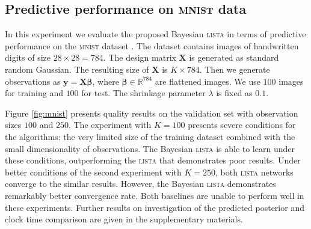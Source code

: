 \documentclass{article}
\begin{document}

\subsection{Predictive performance on \textsc{mnist} data}
In this experiment we evaluate the proposed Bayesian \textsc{lista} in terms of predictive performance on the \textsc{mnist} dataset \cite{lecun1998gradient}. The dataset contains images of handwritten digits of size $28 \times 28 = 784$. The design matrix $\mathbf{X}$ is generated as standard random Gaussian. The resulting size of $\mathbf{X}$ is $K \times 784$. Then we generate observations as $\mathbf{y} = \mathbf{X}\boldsymbol\beta$, where $\boldsymbol\beta \in \mathbb{R}^{784}$ are flattened images. We use $100$ images for training and $100$ for test. The shrinkage parameter $\lambda$ is fixed as $0.1$.

Figure \ref{fig:mnist} presents quality results on the validation set with observation sizes $100$ and $250$. The experiment with $K=100$ presents severe conditions for the algorithms: the very limited size of the training dataset combined with the small dimensionality of observations. The Bayesian \textsc{lista} is able to learn under these conditions, outperforming the \textsc{lista} that demonstrates poor results. Under better conditions of the second experiment with $K=250$, both \textsc{lista} networks converge to the similar results. However, the Bayesian \textsc{lista} demonstrates remarkably better convergence rate. Both baselines are unable to perform well in these experiments. Further results on investigation of the predicted posterior and clock time comparison are given in the supplementary materials.
\end{document}
